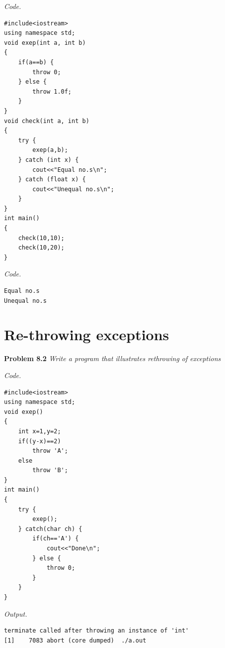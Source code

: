 \documentclass[12pt]{article}
\begin{document}
\textit{Code.}
\begin{lstlisting}
#include<iostream>
using namespace std;
void exep(int a, int b)
{
	if(a==b) {
		throw 0;
	} else {
		throw 1.0f;
	}
}
void check(int a, int b)
{
	try {
		exep(a,b);
	} catch (int x) {
		cout<<"Equal no.s\n";
	} catch (float x) {
		cout<<"Unequal no.s\n";
	}
}
int main()
{
	check(10,10);
	check(10,20);
}
\end{lstlisting}

\textit{Code.}
\begin{lstlisting}
Equal no.s
Unequal no.s
\end{lstlisting}

\section{Re-throwing exceptions}
\textbf{Problem 8.2} \textit{Write a program that illustrates rethrowing of exceptions}

\textit{Code.}
\begin{lstlisting}
#include<iostream>
using namespace std;
void exep()
{
	int x=1,y=2;
	if((y-x)==2)
		throw 'A';
	else
		throw 'B';
}
int main()
{
	try {
		exep();
	} catch(char ch) {
		if(ch=='A') {
			cout<<"Done\n";
		} else {
			throw 0;
		}
	}
}
\end{lstlisting}

\textit{Output.}
\begin{lstlisting}
terminate called after throwing an instance of 'int'
[1]    7083 abort (core dumped)  ./a.out
\end{lstlisting}
\end{document}
